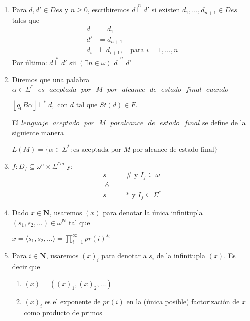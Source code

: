 \documentclass{article}
\begin{document}
\begin{enumerate}
        \item Para $d, d' \in Des$ y $n \geq 0$, escribiremos $d \overset{n}{\vdash} d'$
        si existen $d_1, \dots, d_{n+1} \in Des$ tales que 
        \begin{align*}
                d &= d_1 \\
                d' &= d_{n+1} \\
                d_i &\vdash d_{i+1}, \quad \text{para } i = 1, \ldots, n
        \end{align*}
        Por último: $d \overset{*}{\vdash} d'$ sii $(\exists n \in \omega)$ $d \overset{n}{\vdash} d'$

        \item Diremos que una palabra $\alpha \in \Sigma^{*} \text{ } es \text{ } 
        aceptada \text{ } por \text{ } M \text{ } por \text{ } alcance \text{ }
        de \text{ } estado \text{ } final \text{ } cuando$
        \begin{center}
                $\left\lfloor q_0 B \alpha \right\rfloor \vdash^* d, 
                \text{ con } d \text{ tal que } St(d) \in F.$
        \end{center}
        El $lenguaje \text{ } aceptado \text{ } por \text{ } M \text{ } por alcance
        \text{ } de \text{ } estado \text{ } final$ se define de la siguiente manera
        \begin{center}
                $L(M) = \{ \alpha \in \Sigma^{*}: \text{es aceptada por } M \text{ por 
                alcance de estado final}\}$
        \end{center}

        \item $f : D_f \subseteq \omega^n \times \Sigma^{*m}$ y:
        \begin{align*}
                s &= \# \text{ y } I_f \subseteq \omega \\
                \text{ ó } \\
                s &= * \text{ y } I_f \subseteq \Sigma^{*}
        \end{align*}

        \item Dado $x \in \mathbf{N}$, usaremos $(x)$ para denotar la única infinitupla
        $(s_1, s_2, \dots) \in \omega^{\mathbf{N}}$ tal que
        \begin{center}
                $x = \langle s_1, s_2, \dots \rangle = \displaystyle \prod_{i=1}^{\infty} pr(i)^{s_i}$
        \end{center}

        \item Para $i \in \mathbf{N}$, usaremos $(x)_i$ para denotar a $s_i$ de la infinitupla
        $(x)$. Es decir que 
        \begin{enumerate}
                \item $(x) = ((x)_1, (x)_2, \dots)$
                \item $(x)_i$ es el exponente de $pr(i)$ en la (única posible) factorización de 
                $x$ como producto de primos

        \end{enumerate}
\end{enumerate}
\end{document}
